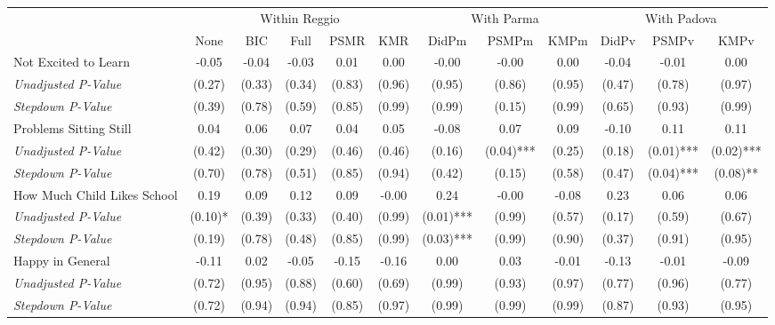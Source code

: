 \begin{tabular}{l c c c c c c c c c c c}
\toprule
& \multicolumn{5}{c}{Within Reggio} & \multicolumn{3}{c}{With Parma} & \multicolumn{3}{c}{With Padova} \\\cmidrule(lr){2-6} \cmidrule(lr){7-9} \cmidrule(lr){10-12}
 & None & BIC & Full & PSMR & KMR & DidPm & PSMPm & KMPm & DidPv & PSMPv & KMPv \\
\midrule
Not Excited to Learn & -0.05 & -0.04 & -0.03 & 0.01 & 0.00 & -0.00 & -0.00 & 0.00 & -0.04 & -0.01 & 0.00 \\
\quad \textit{Unadjusted P-Value} & (0.27) & (0.33) & (0.34) & (0.83) & (0.96) & (0.95) & (0.86) & (0.95) & (0.47) & (0.78) & (0.97) \\
\quad \textit{Stepdown P-Value} & (0.39) & (0.78) & (0.59) & (0.85) & (0.99) & (0.99) & (0.15) & (0.99) & (0.65) & (0.93) & (0.99) \\
Problems Sitting Still & 0.04 & 0.06 & 0.07 & 0.04 & 0.05 & -0.08 & 0.07 & 0.09 & -0.10 & 0.11 & 0.11 \\
\quad \textit{Unadjusted P-Value} & (0.42) & (0.30) & (0.29) & (0.46) & (0.46) & (0.16) & (0.04)*** & (0.25) & (0.18) & (0.01)*** & (0.02)*** \\
\quad \textit{Stepdown P-Value} & (0.70) & (0.78) & (0.51) & (0.85) & (0.94) & (0.42) & (0.15) & (0.58) & (0.47) & (0.04)*** & (0.08)** \\
How Much Child Likes School & 0.19 & 0.09 & 0.12 & 0.09 & -0.00 & 0.24 & -0.00 & -0.08 & 0.23 & 0.06 & 0.06 \\
\quad \textit{Unadjusted P-Value} & (0.10)* & (0.39) & (0.33) & (0.40) & (0.99) & (0.01)*** & (0.99) & (0.57) & (0.17) & (0.59) & (0.67) \\
\quad \textit{Stepdown P-Value} & (0.19) & (0.78) & (0.48) & (0.85) & (0.99) & (0.03)*** & (0.99) & (0.90) & (0.37) & (0.91) & (0.95) \\
Happy in General & -0.11 & 0.02 & -0.05 & -0.15 & -0.16 & 0.00 & 0.03 & -0.01 & -0.13 & -0.01 & -0.09 \\
\quad \textit{Unadjusted P-Value} & (0.72) & (0.95) & (0.88) & (0.60) & (0.69) & (0.99) & (0.93) & (0.97) & (0.77) & (0.96) & (0.77) \\
\quad \textit{Stepdown P-Value} & (0.72) & (0.94) & (0.94) & (0.85) & (0.97) & (0.99) & (0.99) & (0.99) & (0.87) & (0.93) & (0.95) \\
\bottomrule
\end{tabular}
